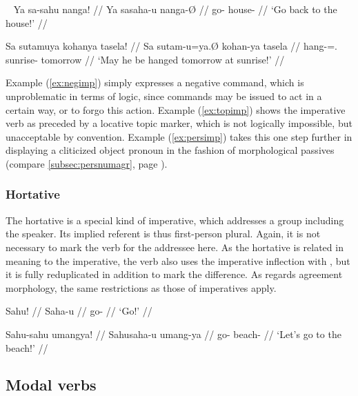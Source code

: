 \pex~\label{ex:agrimp}
\a\label{ex:topimp}\ljudge*\begingl
	\gla Ya sa-sahu nanga! //
	\glb Ya sa\til{}saha-u nanga-Ø //
	\glc \LocT{} \Iter{}\til{}go-\Imp{} house-\Top{} //
	\glft `Go back to the house!' //
\endgl

\a\label{ex:persimp}\ljudge*\begingl
	\gla Sa sutamuya kohanya tasela! //
	\glb Sa sutam-u=ya.Ø kohan-ya tasela //
	\glc \PatT{} hang-\Imp{}=\TsgM{}.\Top{} sunrise-\Loc{} tomorrow //
	\glft `May he be hanged tomorrow at sunrise!' //
\endgl
\xe

Example (\ref{ex:negimp}) simply expresses a negative command, which is 
unproblematic in terms of logic, since commands may be issued to act in a 
certain way, or to forgo this action. Example (\ref{ex:topimp}) shows the 
imperative verb as preceded by a locative topic marker, which is not logically 
impossible, but unacceptable by convention. Example (\ref{ex:persimp}) takes 
this one step further in displaying a cliticized object pronoun in the fashion 
of morphological passives (compare \autoref{subsec:persnumagr}, page 
\pageref{patagr}).


\subsubsection{Hortative}

The hortative is a special kind of imperative, which addresses a group 
including the speaker. Its implied referent is thus first-person plural. 
Again, it is not necessary to mark the verb for the addressee here. As 
the hortative is related in meaning to the imperative, the verb also uses the 
imperative inflection with , but it is fully reduplicated in 
addition to mark the difference. As regards agreement morphology, the same 
restrictions as those of imperatives apply.

\pex
\a\begingl
	\gla Sahu! //
	\glb Saha-u //
	\glc go-\Imp{} //
	\glft `Go!' //
\endgl

\a\begingl
	\gla Sahu-sahu umangya! //
	\glb Sahu\til{}saha-u umang-ya //
	\glc \Hort{}\til{}go-\Imp{} beach-\Loc{} //
	\glft `Let's go to the beach!' //
\endgl
\xe



\subsection{Modal verbs}
\label{subsec:modals}

